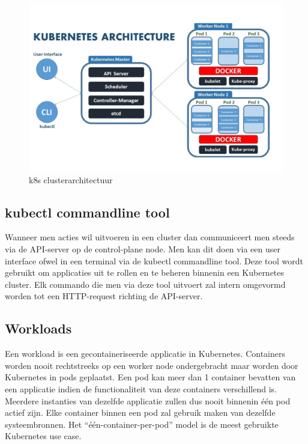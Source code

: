 \begin{figure}[h]
    \centering
    \includegraphics[scale=.7]{img/k8s-architecture.png}
    \caption{k8s clusterarchitectuur \autocite{Collabnix2019}}
    \label{k8s-architectuur}
\end{figure}

\subsection{kubectl commandline tool}

Wanneer men acties wil uitvoeren in een cluster dan communiceert men steeds via de API-server op de control-plane node. Men kan dit doen via een user interface ofwel in een terminal via de kubectl commandline tool. Deze tool wordt gebruikt om applicaties uit te rollen en te beheren binnenin een Kubernetes cluster.
Elk commando die men via deze tool uitvoert zal intern omgevormd worden tot een HTTP-request richting de API-server. \autocite{Biradar2019}
   

\subsection{Workloads}
\label{sec:workloads}

Een workload is een gecontaineriseerde applicatie in Kubernetes. Containers worden nooit rechtstreeks op een worker node ondergebracht maar worden door Kubernetes in pods geplaatst. Een pod kan meer dan 1 container bevatten van een applicatie indien de functionaliteit van deze containers verschillend is. Meerdere instanties van dezelfde applicatie zullen dus nooit binnenin één pod actief zijn. Elke container binnen een pod zal gebruik maken van dezelfde systeembronnen. Het “één-container-per-pod” model is de meest gebruikte Kubernetes use case. \autocite{Kubernetes2022}

